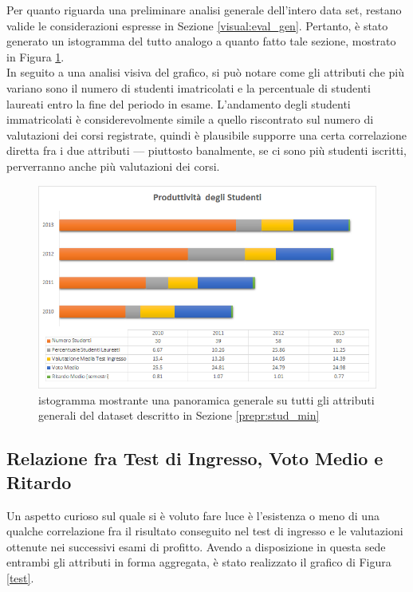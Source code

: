     Per quanto riguarda una preliminare analisi generale dell'intero data set, restano valide le considerazioni espresse in Sezione \ref{visual:eval_gen}. Pertanto, è stato generato un istogramma del tutto analogo a quanto fatto tale sezione, mostrato in Figura \ref{stud_gen}. \\

    In seguito a una analisi visiva del grafico, si può notare come gli attributi che più variano sono il numero di studenti imatricolati e la percentuale di studenti laureati entro la fine del periodo in esame. L'andamento degli studenti immatricolati è considerevolmente simile a quello riscontrato sul numero di valutazioni dei corsi registrate, quindi è plausibile supporre una certa correlazione diretta fra i due attributi --- piuttosto banalmente, se ci sono più studenti iscritti, perverranno anche più valutazioni dei corsi.

    \begin{figure}
        \centering
        \caption{istogramma mostrante una panoramica generale su tutti gli attributi generali del dataset descritto in Sezione \ref{prepr:stud_min}}
        \label{stud_gen}
        \includegraphics[scale=0.50]{../visual/stud_1.png}
    \end{figure}

    \subsection{Relazione fra Test di Ingresso, Voto Medio e Ritardo}

    Un aspetto curioso sul quale si è voluto fare luce è l'esistenza o meno di una qualche correlazione fra il risultato conseguito nel test di ingresso e le valutazioni ottenute nei successivi esami di profitto. Avendo a disposizione in questa sede entrambi gli attributi in forma aggregata, è stato realizzato il grafico di Figura \ref{test}. \\

